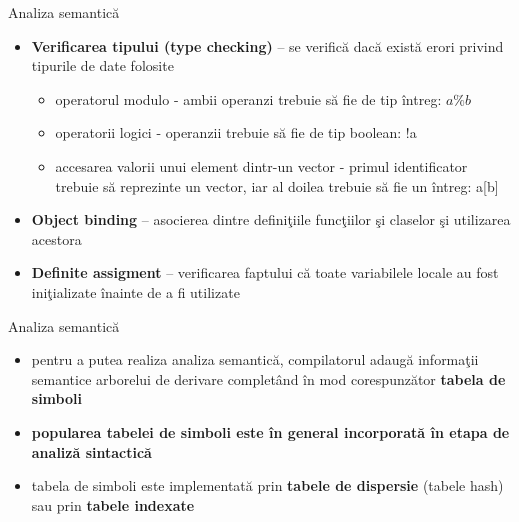 \documentclass[pdf]{beamer}
\begin{document}
\begin{frame}{Analiza semantică}
\begin{itemize}
\item
\textbf{Verificarea tipului (type checking)} – se verifică dacă există erori privind tipurile de date folosite

\begin{itemize}
\item
operatorul modulo - ambii operanzi trebuie să fie de tip întreg: $a \% b$
\item
operatorii logici - operanzii trebuie să fie de tip boolean: !a

\item
accesarea valorii unui element dintr-un vector - primul identificator trebuie să reprezinte un vector, iar al doilea trebuie să fie un întreg: a[b]
\end{itemize}

\item
\textbf{Object binding} – asocierea dintre definiţiile funcţiilor şi claselor şi utilizarea acestora

\item
\textbf{Definite assigment } – verificarea faptului că toate variabilele locale au fost iniţializate înainte de a fi utilizate\end{itemize}
\end{frame}



\begin{frame}{Analiza semantică}
\begin{itemize}
\item
pentru a putea realiza analiza semantică, compilatorul adaugă informaţii semantice arborelui de derivare completând în mod corespunzător \textbf{tabela de simboli}

\item
\textbf{popularea tabelei de simboli este în general incorporată în etapa de analiză sintactică}

\item
tabela de simboli este implementată prin \textbf{tabele de dispersie} (tabele hash) sau prin \textbf{tabele indexate}
\end{itemize}
\end{frame}
\end{document}
